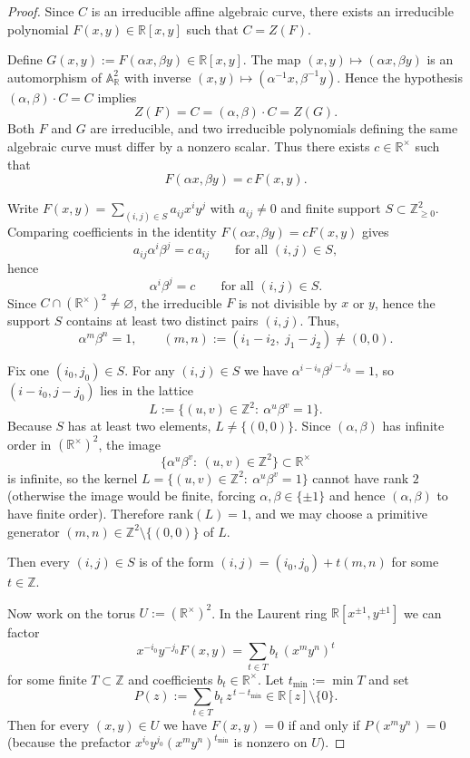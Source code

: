\documentclass[12pt,reqno]{amsart}
\numberwithin{equation}{section}
\begin{document}
\begin{proof}
Since $C$ is an irreducible affine algebraic curve, there exists an irreducible polynomial
$F(x,y)\in \mathbb{R}[x,y]$ such that $C=Z(F)$.

Define $G(x,y):=F(\alpha x,\beta y)\in\mathbb{R}[x,y]$.
The map $(x,y)\mapsto(\alpha x,\beta y)$ is an automorphism of $\mathbb{A}^2_{\mathbb{R}}$ with inverse
$(x,y)\mapsto(\alpha^{-1}x,\beta^{-1}y)$.
Hence the hypothesis $(\alpha,\beta)\cdot C=C$ implies
\[
Z(F)=C=(\alpha,\beta)\cdot C=Z(G).
\]
Both $F$ and $G$ are irreducible, and two irreducible polynomials defining the same algebraic curve
must differ by a nonzero scalar. Thus there exists $c\in\mathbb{R}^{\times}$ such that
\[
F(\alpha x,\beta y)=c\,F(x,y).
\]

Write $F(x,y)=\sum_{(i,j)\in S} a_{ij}x^iy^j$ with $a_{ij}\neq 0$ and finite support $S\subset\mathbb{Z}_{\ge 0}^2$.
Comparing coefficients in the identity $F(\alpha x,\beta y)=cF(x,y)$ gives
\[
a_{ij}\alpha^i\beta^j=c\,a_{ij}\qquad\text{for all }(i,j)\in S,
\]
hence
\[
\alpha^i\beta^j=c\qquad\text{for all }(i,j)\in S.
\]
Since $C\cap(\mathbb R^\times)^2\neq\varnothing$, the irreducible $F$ is not divisible by $x$ or $y$,
hence the support $S$ contains at least two distinct pairs $(i,j)$. Thus,
\[
\alpha^{m}\beta^{n}=1,\qquad (m,n):=(i_1-i_2,\;j_1-j_2)\neq(0,0).
\]

Fix one $(i_0,j_0)\in S$. For any $(i,j)\in S$ we have $\alpha^{i-i_0}\beta^{j-j_0}=1$, so
$(i-i_0,j-j_0)$ lies in the lattice
\[
L:=\{(u,v)\in\mathbb{Z}^2:\ \alpha^u\beta^v=1\}.
\]
Because $S$ has at least two elements, $L\neq\{(0,0)\}$. Since $(\alpha,\beta)$ has infinite order in $(\mathbb R^\times)^2$, the image
\[
\{\alpha^u\beta^v:\ (u,v)\in\mathbb Z^2\}\subset \mathbb R^\times
\]
is infinite, so the kernel $L=\{(u,v)\in\mathbb Z^2:\ \alpha^u\beta^v=1\}$ cannot have rank $2$ (otherwise the image would be finite, forcing $\alpha,\beta\in\{\pm1\}$ and hence $(\alpha,\beta)$ to have finite order). Therefore $\mathrm{rank}(L)=1$, and we may choose a primitive generator $(m,n)\in\mathbb{Z}^2\setminus\{(0,0)\}$ of $L$.

Then every $(i,j)\in S$ is of the form $(i,j)=(i_0,j_0)+t(m,n)$ for some $t\in\mathbb{Z}$.

Now work on the torus $U:=(\mathbb{R}^{\times})^2$. In the Laurent ring $\mathbb{R}[x^{\pm1},y^{\pm1}]$ we can factor
\[
x^{-i_0}y^{-j_0}F(x,y)=\sum_{t\in T} b_t\,(x^my^n)^t
\]
for some finite $T\subset\mathbb{Z}$ and coefficients $b_t\in\mathbb{R}^{\times}$.
Let $t_{\min}:=\min T$ and set
\[
P(z):=\sum_{t\in T} b_t\,z^{\,t-t_{\min}}\in\mathbb{R}[z]\setminus\{0\}.
\]
Then for every $(x,y)\in U$ we have $F(x,y)=0$ if and only if $P(x^my^n)=0$
(because the prefactor $x^{i_0}y^{j_0}(x^my^n)^{t_{\min}}$ is nonzero on $U$).


\end{proof}
\end{document}
